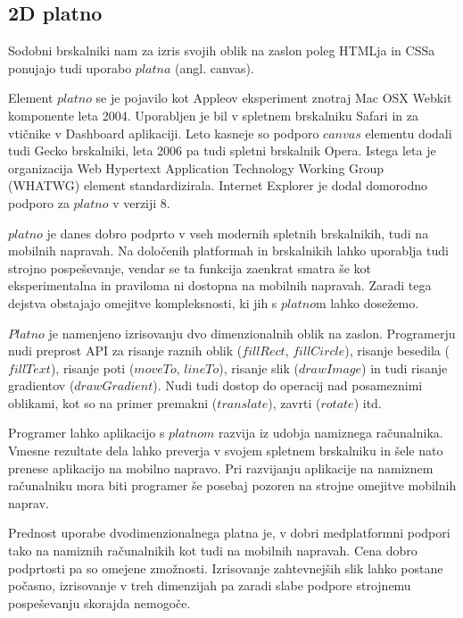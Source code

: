 \subsection{2D platno}

Sodobni brskalniki nam za izris svojih oblik na zaslon poleg HTMLja in CSSa ponujajo tudi uporabo $platna$ (angl. canvas). 

Element $platno$ se je pojavilo kot Appleov eksperiment znotraj Mac OSX Webkit komponente leta 2004. Uporabljen je bil v spletnem brskalniku Safari in za vtičnike v Dashboard aplikaciji. Leto kasneje so podporo $canvas$ elementu dodali tudi Gecko brskalniki, leta 2006 pa tudi spletni brskalnik Opera. Istega leta je organizacija Web Hypertext Application Technology Working Group (WHATWG) element standardizirala. Internet Explorer je dodal domorodno podporo za $platno$ v verziji 8.

$platno$ je danes dobro podprto v vseh modernih spletnih brskalnikih, tudi na mobilnih napravah. Na določenih platformah in brskalnikih lahko uporablja tudi strojno pospeševanje, vendar se ta funkcija zaenkrat smatra še kot eksperimentalna in praviloma ni dostopna na mobilnih napravah. Zaradi tega dejstva obstajajo omejitve kompleksnosti, ki jih s $platno$m lahko dosežemo.


$Platno$ je namenjeno izrisovanju dvo dimenzionalnih oblik na zaslon. Programerju nudi preprost API za risanje raznih oblik ($fillRect$, $fillCircle$), risanje besedila ($fillText$), risanje poti ($moveTo$, $lineTo$), risanje slik ($drawImage$) in tudi risanje gradientov ($drawGradient$). Nudi tudi dostop do operacij nad posameznimi oblikami, kot so na primer premakni ($translate$), zavrti ($rotate$) itd. 

Programer lahko aplikacijo s $platnom$ razvija iz udobja namiznega računalnika. Vmesne rezultate dela lahko preverja v svojem spletnem brskalniku in šele nato prenese aplikacijo na mobilno napravo. Pri razvijanju aplikacije na namiznem računalniku mora biti programer še posebaj pozoren na strojne omejitve mobilnih naprav. 

Prednost uporabe dvodimenzionalnega platna je, v dobri medplatformni podpori tako na namiznih računalnikih kot tudi na mobilnih napravah. Cena dobro podprtosti pa so omejene zmožnosti. Izrisovanje zahtevnejših slik lahko postane počasno, izrisovanje v treh dimenzijah pa zaradi slabe podpore strojnemu pospeševanju skorajda nemogoče. 

